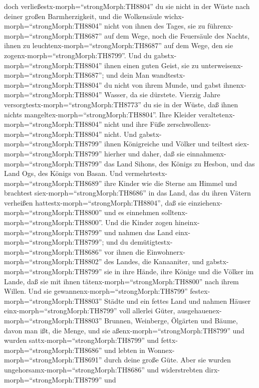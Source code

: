 doch verließestx-morph=``strongMorph:TH8804'' du sie nicht in der Wüste
nach deiner großen Barmherzigkeit, und die Wolkensäule
wichx-morph=``strongMorph:TH8804'' nicht von ihnen des Tages, sie zu
führenx-morph=``strongMorph:TH8687'' auf dem Wege, noch die Feuersäule
des Nachts, ihnen zu leuchtenx-morph=``strongMorph:TH8687'' auf dem
Wege, den sie zogenx-morph=``strongMorph:TH8799''.  Und du
gabstx-morph=``strongMorph:TH8804'' ihnen einen guten Geist, sie zu
unterweisenx-morph=``strongMorph:TH8687''; und dein Man
wandtestx-morph=``strongMorph:TH8804'' du nicht von ihrem Munde, und
gabst ihnenx-morph=``strongMorph:TH8804'' Wasser, da sie dürstete.
 Vierzig Jahre versorgtestx-morph=``strongMorph:TH8773'' du
sie in der Wüste, daß ihnen nichts
mangeltex-morph=``strongMorph:TH8804''. Ihre Kleider
veraltetenx-morph=``strongMorph:TH8804'' nicht und ihre Füße
zerschwollenx-morph=``strongMorph:TH8804'' nicht.  Und
gabstx-morph=``strongMorph:TH8799'' ihnen Königreiche und Völker und
teiltest siex-morph=``strongMorph:TH8799'' hierher und daher, daß sie
einnahmenx-morph=``strongMorph:TH8799'' das Land Sihons, des Königs zu
Hesbon, und das Land Ogs, des Königs von Basan.  Und
vermehrtestx-morph=``strongMorph:TH8689'' ihre Kinder wie die Sterne am
Himmel und brachtest siex-morph=``strongMorph:TH8686'' in das Land, das
du ihren Vätern verheißen hattestx-morph=``strongMorph:TH8804'', daß sie
einziehenx-morph=``strongMorph:TH8800'' und es einnehmen
solltenx-morph=``strongMorph:TH8800''.  Und die Kinder
zogen hineinx-morph=``strongMorph:TH8799'' und nahmen das Land
einx-morph=``strongMorph:TH8799''; und du
demütigtestx-morph=``strongMorph:TH8686'' vor ihnen die
Einwohnerx-morph=``strongMorph:TH8802'' des Landes, die Kanaaniter, und
gabstx-morph=``strongMorph:TH8799'' sie in ihre Hände, ihre Könige und
die Völker im Lande, daß sie mit ihnen
tätenx-morph=``strongMorph:TH8800'' nach ihrem Willen.  Und
sie gewannenx-morph=``strongMorph:TH8799''
festex-morph=``strongMorph:TH8803'' Städte und ein fettes Land und
nahmen Häuser einx-morph=``strongMorph:TH8799'' voll allerlei Güter,
ausgehauenex-morph=``strongMorph:TH8803'' Brunnen, Weinberge, Ölgärten
und Bäume, davon man ißt, die Menge, und sie
aßenx-morph=``strongMorph:TH8799'' und wurden
sattx-morph=``strongMorph:TH8799'' und
fettx-morph=``strongMorph:TH8686'' und lebten in
Wonnex-morph=``strongMorph:TH8691'' durch deine große Güte.
 Aber sie wurden ungehorsamx-morph=``strongMorph:TH8686''
und widerstrebten dirx-morph=``strongMorph:TH8799'' und
